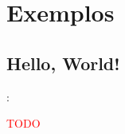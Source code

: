 \section{Exemplos}


\subsection{Hello, World!}


\begin{frame}{\insertsection: \insertsubsection}

	\textcolor{red}{TODO}

\end{frame}

